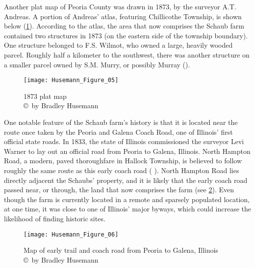 Another plat map of Peoria County was drawn in 1873, by the surveyor A.T. Andreas. A portion of Andreas’ atlas, featuring Chillicothe Township, is shown below (\cref{fig:Husemann_Figure_05}). According to the atlas, the area that now comprises the Schaub farm contained two structures in 1873 (on the eastern side of the township boundary). One structure belonged to F.S. Wilmot, who owned a large, heavily wooded parcel. Roughly half a kilometer to the southwest, there was another structure on a smaller parcel owned by S.M. Murry, or possibly Murray (\cite{andreas1873}).

\begin{figure}[!htb]
	\texttt{[image: Husemann\_Figure\_05]}
	\caption{1873 plat map
		{\normalfont\scriptsize \\ \copyright\ by Bradley Husemann
	}}
	\label{fig:Husemann_Figure_05}
\end{figure}

One notable feature of the Schaub farm’s history is that it is located near the route once taken by the Peoria and Galena Coach Road, one of Illinois’ first official state roads. In 1833, the state of Illinois commissioned the surveyor Levi Warner to lay out an official road from Peoria to Galena, Illinois. North Hampton Road, a modern, paved thoroughfare in Hallock Township, is believed to follow roughly the same route as this early coach road (\cite{illinois94} %
).
North Hampton Road lies directly adjacent the Schaubs’ property, and it is likely that the early coach road passed near, or through, the land that now comprises the farm (see \cref{fig:Husemann_Figure_06}). Even though the farm is currently located in a remote and sparsely populated location, at one time, it was close to one of Illinois’ major byways, which could increase the likelihood of finding historic sites.

\begin{figure}[!htb]
	\texttt{[image: Husemann\_Figure\_06]}
	\caption{Map of early trail and coach road from Peoria to Galena, Illinois
		{\normalfont\scriptsize \\ \copyright\ by Bradley Husemann
	}}
	\label{fig:Husemann_Figure_06}
\end{figure}


